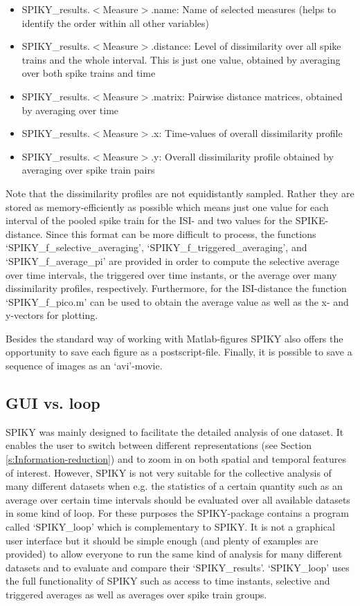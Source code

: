 \documentclass[10pt,twocolumn]{elsart5p}
\begin{document}
\begin{itemize}
\item SPIKY\_results.$<$Measure$>$.name: Name of selected measures (helps to identify the order within all other variables)
\item SPIKY\_results.$<$Measure$>$.distance: Level of dissimilarity over all spike trains and the whole interval. This is just one value, obtained by averaging over both spike trains and time
\item SPIKY\_results.$<$Measure$>$.matrix: Pairwise distance matrices, obtained by averaging over time
\item SPIKY\_results.$<$Measure$>$.x: Time-values of overall dissimilarity profile
\item SPIKY\_results.$<$Measure$>$.y: Overall dissimilarity profile obtained by averaging over spike train pairs
\end{itemize}

Note that the dissimilarity profiles are not equidistantly sampled. Rather they are stored as memory-efficiently as possible which means just one value for each interval of the pooled spike train for the ISI- and two values for the SPIKE-distance. Since this format can be more difficult to process, the functions `SPIKY\_f\_selective\_averaging', `SPIKY\_f\_triggered\_averaging', and `SPIKY\_f\_average\_pi' are provided in order to compute the selective average over time intervals, the triggered over time instants, or the average over many dissimilarity profiles, respectively. Furthermore, for the ISI-distance the function `SPIKY\_f\_pico.m' can be used to obtain the average value as well as the x- and y-vectors for plotting.

Besides the standard way of working with Matlab-figures SPIKY also offers the opportunity to save each figure as a postscript-file. Finally, it is possible to save a sequence of images as an `avi'-movie.


\subsection{\label{ss:GUI-vs-loop} GUI vs. loop}

SPIKY was mainly designed to facilitate the detailed analysis of one dataset. It enables the user to switch between different representations (see Section \ref{s:Information-reduction}) and to zoom in on both spatial and temporal features of interest. However, SPIKY is not very suitable for the collective analysis of many different datasets when e.g. the statistics of a certain quantity such as an average over certain time intervals should be evaluated over all available datasets in some kind of loop. For these purposes the SPIKY-package contains a program called `SPIKY\_loop' which is complementary to SPIKY. It is not a graphical user interface but it should be simple enough (and plenty of examples are provided) to allow everyone to run the same kind of analysis for many different datasets and to evaluate and compare their `SPIKY\_results'. `SPIKY\_loop' uses the full functionality of SPIKY such as access to time instants, selective and triggered averages as well as averages over spike train groups.
\end{document}
